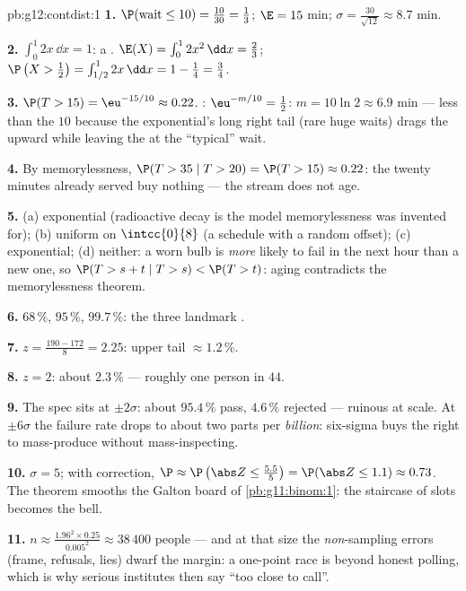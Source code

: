 \begin{solution}{pb:g12:contdist:1}
\textbf{1.} $\P(\text{wait} \leq 10) = \frac{10}{30} =
\frac13$; $\E = 15$ min;
$\sigma = \frac{30}{\sqrt{12}} \approx 8.7$ min.

\textbf{2.} $\int_0^1 2x\,\dd x = 1$: a .
$\E(X) = \int_0^1 2x^2\,\dd x = \frac23$;
$\P\left(X > \frac12\right) = \int_{1/2}^1 2x\,\dd x =
1 - \frac14 = \frac34$.

\textbf{3.} $\P(T > 15) = \eu^{-15/10} \approx 0.22$. :
$\eu^{-m/10} = \frac12$: $m = 10\ln 2 \approx 6.9$ min ---
less than the  $10$ because the exponential's long right
tail (rare huge waits) drags the  upward while leaving the
 at the ``typical'' wait.

\textbf{4.} By memorylessness,
$\P(T > 35 \mid T > 20) = \P(T > 15) \approx 0.22$: the
twenty minutes already served buy nothing --- the stream does
not age.

\textbf{5.} (a) exponential (radioactive decay is the model
memorylessness was invented for); (b) uniform on
$\intcc{0}{8}$ (a schedule with a random offset); (c)
exponential; (d) neither: a worn bulb is \emph{more} likely to
fail in the next hour than a new one, so
$\P(T > s + t \mid T > s) < \P(T > t)$: aging contradicts the
memorylessness theorem.

\textbf{6.} $68\,\%$, $95\,\%$, $99.7\,\%$: the three
landmark .

\textbf{7.} $z = \frac{190 - 172}{8} = 2.25$: upper tail
$\approx 1.2\,\%$.

\textbf{8.} $z = 2$: about $2.3\,\%$ --- roughly one person
in $44$.

\textbf{9.} The spec sits at $\pm 2\sigma$: about
$95.4\,\%$ pass, $4.6\,\%$ rejected --- ruinous at scale. At
$\pm 6\sigma$ the failure rate drops to about two parts per
\emph{billion}: six-sigma buys the right to mass-produce
without mass-inspecting.

\textbf{10.} $\sigma = 5$; with  correction,
$\P \approx \P\left(\abs Z \leq \frac{5.5}{5}\right) =
\P(\abs Z \leq 1.1) \approx 0.73$. The theorem smooths the
Galton board of \cref{pb:g11:binom:1}: the staircase of slots
becomes the  bell.

\textbf{11.} $n \approx \frac{1.96^2 \times 0.25}{0.005^2}
\approx 38\,400$ people --- and at that size the
\emph{non}-sampling errors (frame, refusals, lies) dwarf the
margin: a one-point race is beyond honest polling, which is
why serious institutes then say ``too close to call''.


\end{solution}
